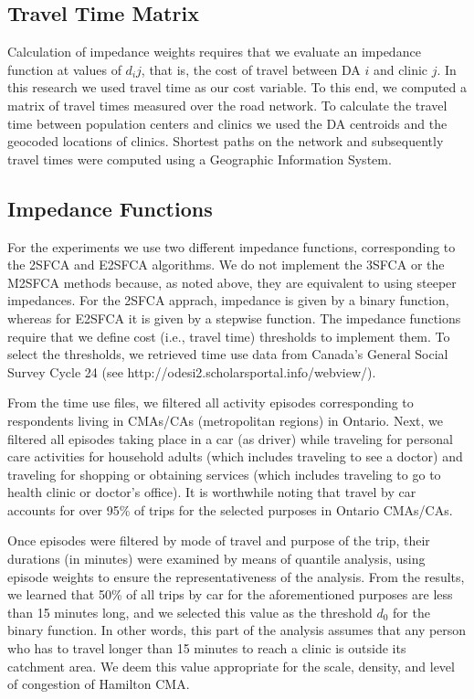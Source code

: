 \documentclass[10pt,letterpaper]{article}
\begin{document}
\subsection{Travel Time Matrix}\label{travel-time-matrix}

Calculation of impedance weights requires that we evaluate an impedance
function at values of \(d_ij\), that is, the cost of travel between DA
\(i\) and clinic \(j\). In this research we used travel time as our cost
variable. To this end, we computed a matrix of travel times measured
over the road network. To calculate the travel time between population
centers and clinics we used the DA centroids and the geocoded locations
of clinics. Shortest paths on the network and subsequently travel times
were computed using a Geographic Information System.

\subsection{Impedance Functions}\label{impedance-functions}

For the experiments we use two different impedance functions,
corresponding to the 2SFCA and E2SFCA algorithms. We do not implement
the 3SFCA or the M2SFCA methods because, as noted above, they are
equivalent to using steeper impedances. For the 2SFCA apprach, impedance
is given by a binary function, whereas for E2SFCA it is given by a
stepwise function. The impedance functions require that we define cost
(i.e., travel time) thresholds to implement them. To select the
thresholds, we retrieved time use data from Canada's General Social
Survey Cycle 24 (see http://odesi2.scholarsportal.info/webview/).

From the time use files, we filtered all activity episodes corresponding
to respondents living in CMAs/CAs (metropolitan regions) in Ontario.
Next, we filtered all episodes taking place in a car (as driver) while
traveling for personal care activities for household adults (which
includes traveling to see a doctor) and traveling for shopping or
obtaining services (which includes traveling to go to health clinic or
doctor's office). It is worthwhile noting that travel by car accounts
for over 95\% of trips for the selected purposes in Ontario CMAs/CAs.

Once episodes were filtered by mode of travel and purpose of the trip,
their durations (in minutes) were examined by means of quantile
analysis, using episode weights to ensure the representativeness of the
analysis. From the results, we learned that 50\% of all trips by car for
the aforementioned purposes are less than 15 minutes long, and we
selected this value as the threshold \(d_0\) for the binary function. In
other words, this part of the analysis assumes that any person who has
to travel longer than 15 minutes to reach a clinic is outside its
catchment area. We deem this value appropriate for the scale, density,
and level of congestion of Hamilton CMA.
\end{document}
